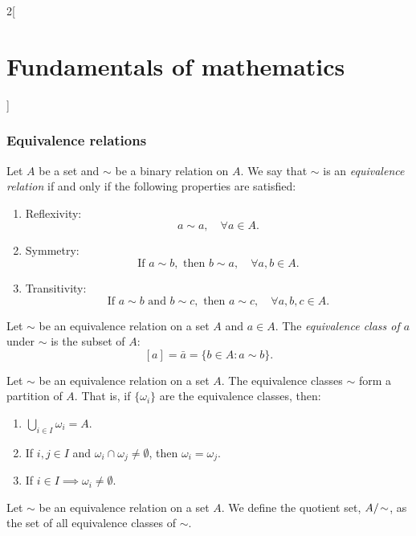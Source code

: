 \documentclass[../../../main.tex]{subfiles}
\begin{document}
\begin{multicols}{2}[\section{Fundamentals of mathematics}]
    \subsubsection*{Equivalence relations}
    \begin{definition}
        Let $A$ be a set and $\sim$ be a binary relation on $A$. We say that $\sim$ is an \textit{equivalence relation} if and only if the following properties are satisfied:
        \begin{enumerate}
            \item Reflexivity: $$a\sim a,\quad\forall a\in A.$$
            \item Symmetry: $$\text{If }a\sim b, \text{ then }b\sim a,\quad\forall a,b\in A.$$
            \item Transitivity:
            $$\text{If }a\sim b\text{ and }b\sim c,\text{ then }a\sim c,\quad\forall a,b,c\in A.$$
        \end{enumerate}
    \end{definition}
    \begin{definition}
        Let $\sim$ be an equivalence relation on a set $A$ and $a\in A$. The \textit{equivalence class of $a$} under $\sim$ is the subset of $A$: $$[a]=\bar{a}=\{b\in A: a\sim b\}.$$
    \end{definition}
    \begin{theorem}
        Let $\sim$ be an equivalence relation on a set $A$. The equivalence classes $\sim$ form a partition of $A$. That is, if $\{\omega_i\}$ are the equivalence classes, then:
        \begin{enumerate}
            \item $\bigcup_{i\in I} \omega_i=A$.
            \item If $i,j\in I$ and $\omega_i\cap\omega_j\ne\emptyset$, then $\omega_i=\omega_j$.
            \item If $i\in I\implies\omega_i\ne\emptyset$.
        \end{enumerate}
    \end{theorem}
    \begin{definition}
        Let $\sim$ be an equivalence relation on a set $A$. We define the quotient set, $\quot{A}{\!\sim}$, as the set of all equivalence classes of $\sim$.
    \end{definition}

\end{multicols}
\end{document}
